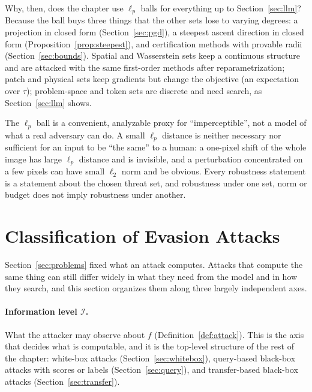 \documentclass[10pt,a4paper]{extarticle}
\theoremstyle{definition}
\begin{document}
Why, then, does the chapter use \(\ell_p\) balls for everything up to Section~\ref{sec:llm}? Because the ball buys three things that the other sets lose to varying degrees: a projection in closed form (Section~\ref{sec:pgd}), a steepest ascent direction in closed form (Proposition~\ref{prop:steepest}), and certification methods with provable radii (Section~\ref{sec:bounds}). Spatial and Wasserstein sets keep a continuous structure and are attacked with the same first-order methods after reparametrization; patch and physical sets keep gradients but change the objective (an expectation over \(\tau\)); problem-space and token sets are discrete and need search, as Section~\ref{sec:llm} shows.

\begin{warnbox}
The \(\ell_p\) ball is a convenient, analyzable proxy for \enquote{imperceptible}, not a model of what a real adversary can do. A small \(\ell_p\) distance is neither necessary nor sufficient for an input to be \enquote{the same} to a human: a one-pixel shift of the whole image has large \(\ell_p\) distance and is invisible, and a perturbation concentrated on a few pixels can have small \(\ell_2\) norm and be obvious. Every robustness statement is a statement about the chosen threat set, and robustness under one set, norm or budget does not imply robustness under another.
\end{warnbox}

\section{Classification of Evasion Attacks}\label{sec:taxonomy}

Section~\ref{sec:problems} fixed what an attack computes. Attacks that compute the same thing can still differ widely in what they need from the model and in how they search, and this section organizes them along three largely independent axes.

\paragraph{Information level \(\mathcal{I}\).} What the attacker may observe about \(f\) (Definition~\ref{def:attack}). This is the axis that decides what is computable, and it is the top-level structure of the rest of the chapter: white-box attacks (Section~\ref{sec:whitebox}), query-based black-box attacks with scores or labels (Section~\ref{sec:query}), and transfer-based black-box attacks (Section~\ref{sec:transfer}).
\end{document}
